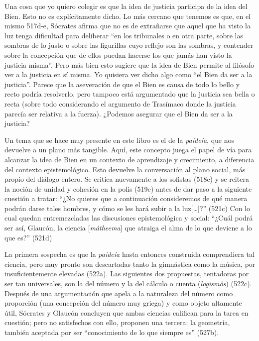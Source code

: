 Una cosa que yo quiero colegir es que la idea
de justicia participa de la idea del Bien.
Esto no es explícitamente dicho. Lo más
cercano que tenemos es que, en el mismo
517d-e, Sócrates afirma que no es de
extrañarse que aquel que ha visto la luz
tenga dificultad para deliberar ``en los
tribunales o en otra parte, sobre las sombras
de lo justo o sobre las figurillas cuyo
reflejo son las sombras, y contender sobre la
concepción que de ellos puedan hacerse los
que jamás han visto la justicia misma''. Pero
más bien esto sugiere que la idea de Bien
permite al filósofo ver a la justicia en sí
misma. Yo quisiera ver dicho algo como ``el
Bien da ser a la justicia''. Parece que la
aseveración de que el Bien es causa de todo
lo bello y recto podría resolverlo, pero
tampoco está argumentado que la justicia sea
bella o recta (sobre todo considerando el
argumento de Trasímaco donde la justicia
parecía ser relativa a la fuerza). ¿Podemos
asegurar que el Bien da ser a la justicia?

Un tema que se hace muy presente en este
libro es el de la \emph{paideía}, que nos
devuelve a un plano más tangible. Aquí, este
concepto juega el papel de vía para alcanzar
la idea de Bien en un contexto de aprendizaje
y crecimiento, a diferencia del contexto
epistemológico. Esto devuelve la conversación
al plano social, más propio del diálogo
entero. Se critica nuevamente a los sofistas
(518c) y se reitera la noción de unidad y
cohesión en la polis (519e) antes de dar paso
a la siguiente cuestión a tratar: ``¿No
quieres que a continuación consideremos de
qué manera podrán darse tales hombres, y cómo
se les hará subir a la luz[\ldots{}]?''
(521c) Con lo cual quedan entremezcladas las
discusiones epistemológica y social: ``¿Cuál
podrá ser así, Glaucón, la ciencia
[\emph{mátheema}] que atraiga el alma de lo
que deviene a lo que es?'' (521d)

La primera sospecha es que la \emph{paideía}
hasta entonces construida comprendiera tal
ciencia, pero muy pronto son descartadas
tanto la gimnástica como la música, por
insuficientemente elevadas (522a). Las
siguientes dos propuestas, tentadoras por ser
tan universales, son la del número y la del
cálculo o cuenta (\emph{logismós}) (522c).
Después de una argumentación que apela a la
naturaleza del número como proporción (una
concepción del número muy griega) y como
objeto altamente útil, Sócrates y Glaucón
concluyen que ambas ciencias califican para
la tarea en cuestión; pero no satisfechos con
ello, proponen una tercera: la geometría,
también aceptada por ser ``conocimiento de lo
que siempre es'' (527b).

